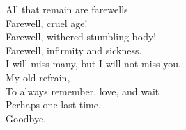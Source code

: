 \documentclass[twoside,10pt]{article}
\begin{document}
\begin{article*}
\hspace*{\fill}All that remain are farewells\\
\hspace*{\fill}Farewell, cruel age!\\
\hspace*{\fill}Farewell, withered stumbling body!\\
\hspace*{\fill}Farewell, infirmity and sickness.\\
\hspace*{\fill}I will miss many, but I will not miss you.\\

\hspace*{\fill}My old refrain,\\
\hspace*{\fill}To always remember, love, and wait\\
\hspace*{\fill}Perhaps one last time.\\

\hspace*{\fill}Goodbye.


\end{article*}
\end{document}
